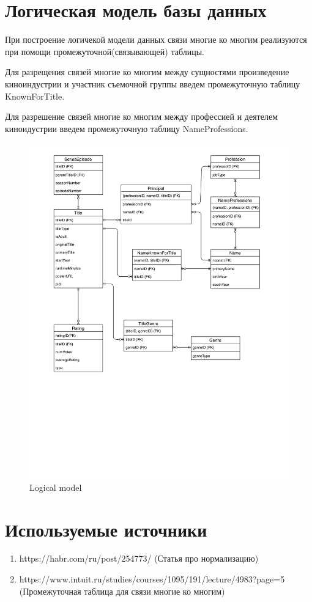\documentclass[12pt,a4paper]{article}
\begin{document}
\section{Логическая модель базы данных}
При построение логичекой модели данных связи многие ко многим реализуются при помощи промежуточной(связывающей) таблицы. \par
Для разрещения связей многие ко многим между сущностями произведение киноиндустрии и участник съемочной группы введем промежуточную таблицу KnownForTitle. \par
Для разрешение связей многие ко многим между профессией и деятелем киноидустрии введем промежуточную таблицу NameProfessions. \par
\begin{figure}[ht]
    \includegraphics[width=\linewidth]{images/Lab1/logical_model.jpg}
    \caption{Logical model}
    \label{fig:Logical model}
\end{figure}
\section{Используемые источники}
\begin{enumerate}
    \item https://habr.com/ru/post/254773/ (Статья про нормализацию)
    \item https://www.intuit.ru/studies/courses/1095/191/lecture/4983?page=5 (Промежуточная таблица для связи многие ко многим)
\end{enumerate}
\end{document}

